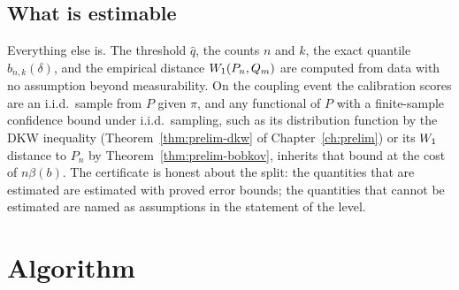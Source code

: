 \documentclass[../../../main.tex]{subfiles}
\begin{document}
\subsection{What is estimable}

Everything else is. The threshold $\hat q$, the counts $n$ and $k$, the exact quantile $b_{n,k}(\delta)$, and the empirical distance $W_1(P_n,Q_m)$ are computed from data with no assumption beyond measurability. On the coupling event the calibration scores are an i.i.d.\ sample from $P$ given $\pi$, and any functional of $P$ with a finite-sample confidence bound under i.i.d.\ sampling, such as its distribution function by the DKW inequality (Theorem~\ref{thm:prelim-dkw} of Chapter~\ref{ch:prelim}) or its $W_1$ distance to $P_n$ by Theorem~\ref{thm:prelim-bobkov}, inherits that bound at the cost of $n\beta(b)$. The certificate is honest about the split: the quantities that are estimated are estimated with proved error bounds; the quantities that cannot be estimated are named as assumptions in the statement of the level.

\section{Algorithm}\label{sec:cert-algorithm}
\end{document}
